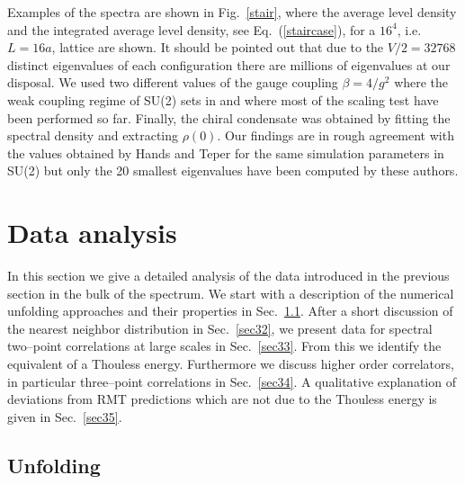 Examples of the spectra are shown in Fig.~\ref{stair}, where the
average level density and the integrated average level density, see
Eq.~(\ref{staircase}), for a $16^4$, i.e.~$L=16a$, lattice are shown.
It should be pointed out that due to the $V/2=32768$ distinct
eigenvalues of each configuration there are millions of eigenvalues at
our disposal. We used two different values of the gauge coupling
$\beta=4/g^2$ where the weak coupling regime of SU(2) sets in and
where most of the scaling test have been performed so far.  Finally,
the chiral condensate was obtained by fitting the spectral density and
extracting $\rho(0)$.  Our findings \cite{MBB98} are in rough
agreement with the values obtained by Hands and Teper \cite {Hands90}
for the same simulation parameters in SU(2) but only the 20 smallest
eigenvalues have been computed by these authors.

\section{Data analysis}
\label{sec3}

In this section we give a detailed analysis of the data introduced in
the previous section in the bulk of the spectrum. We start with a
description of the numerical unfolding approaches and their properties
in Sec.~\ref{sec31}. After a short discussion of the nearest neighbor
distribution in Sec.~\ref{sec32}, we present data for spectral
two--point correlations at large scales in Sec.~\ref{sec33}.  From this
we identify the equivalent of a Thouless energy.  Furthermore we
discuss higher order correlators, in particular three--point
correlations in Sec.~\ref{sec34}. A qualitative explanation of
deviations from RMT predictions which are not due to the Thouless
energy is given in Sec.~\ref{sec35}.


\subsection{Unfolding}
\label{sec31}

